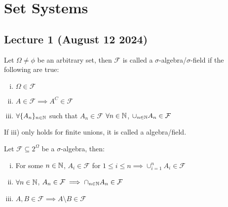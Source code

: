\chapter{Set Systems}
\label{ch:set systems}

\section{Lecture 1 (August 12 2024)}
\begin{definition}
	Let $\Omega \neq \phi$ be an arbitrary set, then $\mathcal F$ is called a $\sigma$-algebra/$\sigma$-field if the following are true:
	\begin{enumerate}[i)]
		\item $\Omega \in \mathcal F$
		\item $A \in \mathcal F \implies A^C \in \mathcal F$
		\item $\forall \{A_n\}_{n \in \mathbb N}$ such that $A_n \in \mathcal F$ $\forall n \in \mathbb N$, $\cup_{n \in \mathbb N} A_n \in \mathcal F$
	\end{enumerate}
\end{definition}

\begin{remark}
	If iii) only holds for finite unions, it is called a algebra/field.
\end{remark}

\begin{lemma}
	Let $\mathcal F \subseteq 2^\Omega$ be a $\sigma$-algebra, then:
	\begin{enumerate}[i)]
		\item For some $ n \in \mathbb N$, $A_i \in \mathcal F$ for $1\leq i \leq n \implies \cup_{i=1}^n A_i \in \mathcal F$
		\item $\forall n \in \mathbb N$, $A_n \in \mathcal F \implies \cap_{n \in \mathbb N} A_n \in \mathcal F$
		\item $A,B \in \mathcal F \implies A \setminus B \in \mathcal F$
	\end{enumerate}
\end{lemma}

